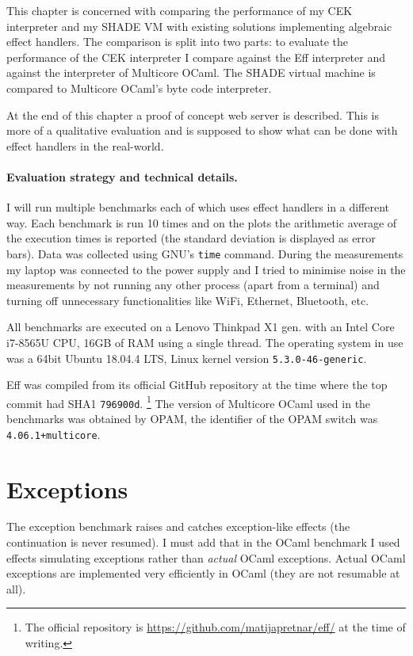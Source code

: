 \documentclass[class=article, crop=false]{standalone}
\begin{document}
This chapter is concerned with comparing the performance of my CEK interpreter
and my SHADE VM with existing solutions implementing algebraic effect handlers.
The comparison is split into two parts: to evaluate the performance of the
CEK interpreter I compare against the Eff interpreter and against the interpreter
of Multicore OCaml. The SHADE virtual machine is compared to Multicore OCaml's
byte code interpreter.

At the end of this chapter a proof of concept web server is described. This is
more of a qualitative evaluation and is supposed to show what can be done 
with effect handlers in the real-world.

\paragraph{Evaluation strategy and technical details.}

I will run multiple benchmarks each of which uses effect handlers in a different
way. Each benchmark is run 10 times and on the plots the arithmetic average of
the execution times is reported (the standard deviation is displayed as error
bars). Data was collected using GNU's \verb|time| command. During the measurements
my laptop was connected to the power supply and I tried to minimise noise in the measurements
by not running any other process (apart from a terminal) and turning off
unnecessary functionalities like WiFi, Ethernet, Bluetooth, etc.

All benchmarks are executed on a Lenovo Thinkpad X1  gen. with an Intel
Core i7-8565U CPU, 16GB of RAM using a single thread. The operating system in
use was a 64bit Ubuntu 18.04.4 LTS, Linux kernel version \verb|5.3.0-46-generic|.

Eff was compiled from its official GitHub repository at the time where the top
commit had SHA1 \verb|796900d|.
\footnote{The official repository is
\url{https://github.com/matijapretnar/eff/} at the time of writing.}
The version of Multicore OCaml used in the benchmarks was obtained by OPAM, the
identifier of the OPAM switch was \verb|4.06.1+multicore|.

\section{Exceptions}

The exception benchmark raises and catches exception-like effects (the
continuation is never resumed). I must add that in the OCaml benchmark I used
effects simulating exceptions rather than \emph{actual} OCaml exceptions. Actual
OCaml exceptions are implemented very efficiently in OCaml (they are not
resumable at all).
\end{document}
